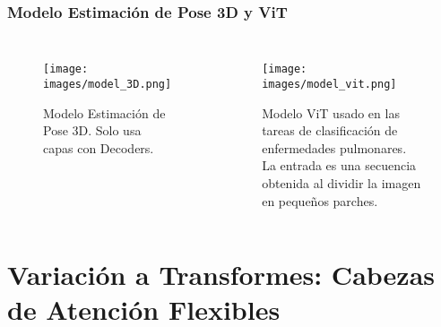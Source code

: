 \documentclass{beamer}
\begin{document}
\begin{frame}
\frametitle{Modelo Estimación de Pose 3D y ViT}
\begin{columns}
    \begin{figure}[htbp]
        \centerline{\texttt{[image: images/model\_3D.png]}}
        \caption{Modelo Estimación de Pose 3D. Solo usa capas con Decoders.}
        \label{fig:m3d}
    \end{figure}

    \begin{figure}[htbp]
    \centerline{\texttt{[image: images/model\_vit.png]}}
    \caption{Modelo ViT usado en las tareas de clasificación de enfermedades
             pulmonares. La entrada es una secuencia obtenida al dividir la imagen
             en pequeños parches.}
    \label{fig:vit}
    \end{figure}
\end{columns}

\end{frame}




\section{Variación a Transformes: Cabezas de Atención Flexibles}
\end{document}
